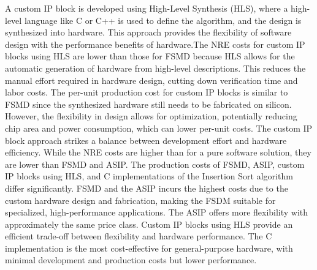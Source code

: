 \documentclass[conference]{IEEEtran}
\begin{document}
A custom IP block is developed using High-Level Synthesis (HLS), where a high-level language like C or C++ is used to define the algorithm, and the design is synthesized into hardware. This approach provides the flexibility of software design with the performance benefits of hardware.The NRE costs for custom IP blocks using HLS are lower than those for FSMD because HLS allows for the automatic generation of hardware from high-level descriptions. This reduces the manual effort required in hardware design, cutting down verification time and labor costs. The per-unit production cost for custom IP blocks is similar to FSMD since the synthesized hardware still needs to be fabricated on silicon. However, the flexibility in design allows for optimization, potentially reducing chip area and power consumption, which can lower per-unit costs. The custom IP block approach strikes a balance between development effort and hardware efficiency. While the NRE costs are higher than for a pure software solution, they are lower than FSMD and ASIP.
The production costs of FSMD, ASIP, custom IP blocks using HLS, and C implementations of the Insertion Sort algorithm differ significantly. FSMD and the ASIP incurs the highest costs due to the custom hardware design and fabrication, making the FSDM suitable for specialized, high-performance applications. The ASIP offers more flexibility with approximately the same price class. Custom IP blocks using HLS provide an efficient trade-off between flexibility and hardware performance. The C implementation is the most cost-effective for general-purpose hardware, with minimal development and production costs but lower performance. 
\end{document}
